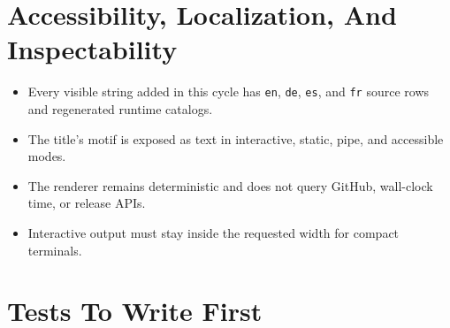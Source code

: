 \section{Accessibility, Localization, And Inspectability}\label{record-112-accessibility-localization-and-inspectability}

\begin{itemize}
\tightlist
\item
  Every visible string added in this cycle has \texttt{e\allowbreak{}n}, \texttt{d\allowbreak{}e}, \texttt{e\allowbreak{}s}, and \texttt{f\allowbreak{}r} source rows and regenerated runtime catalogs.
\item
  The title's motif is exposed as text in interactive, static, pipe, and accessible modes.
\item
  The renderer remains deterministic and does not query GitHub, wall-clock time, or release APIs.
\item
  Interactive output must stay inside the requested width for compact terminals.
\end{itemize}

\section{Tests To Write First}\label{record-112-tests-to-write-first}


